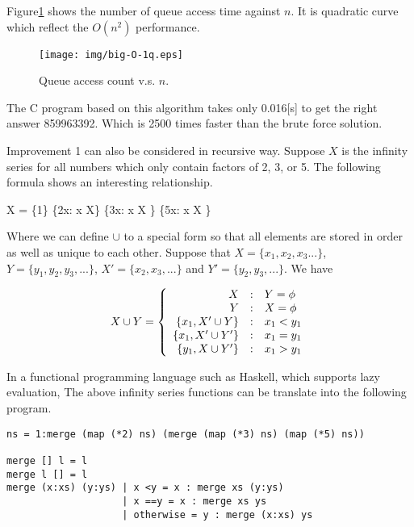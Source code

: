 \documentclass{article}
\begin{document}
Figure\ref{fig:big-O-1q} shows the number of queue access time against $n$.
It is quadratic curve which reflect the $O(n^2)$ performance.

\begin{figure}[htbp]
       \begin{center}
       	  \texttt{[image: img/big-O-1q.eps]}
        \caption{Queue access count v.s. $n$.} \label{fig:big-O-1q}
       \end{center}
\end{figure}

The C program based on this algorithm takes only 0.016[s] to get the right answer
859963392. Which is 2500 times faster than the brute force solution.

Improvement 1 can also be considered in recursive way. Suppose $X$ is the infinity
series for all numbers which only contain factors of 2, 3, or 5. The following
formula shows an interesting relationship.

\be
  X = \{1\} \cup \{2x: \forall x \in X\} \cup \{3x: \forall x \in X \} \cup \{5x: \forall x \in X \}
\ee

Where we can define $\cup$ to a special form so that all elements are stored in order
as well as unique to each other. Suppose that $X=\{x_1, x_2, x_3...\}$, $Y=\{y_1, y_2, y_3, ...\}$, $X' = \{x_2, x_3, ...\}$ and $Y'=\{y_2, y_3, ...\}$. We have

\[
X \cup Y = \left \{
  \begin{array}{r@{\quad:\quad}l}
  X & Y = \phi \\
  Y & X = \phi \\
  \{ x_1, X' \cup Y \} & x_1 < y_1 \\
  \{ x_1, X' \cup Y' \} & x_1 = y_1 \\
  \{ y_1, X \cup Y' \} & x_1 > y_1
  \end{array}
\right.
\]

In a functional programming language such as Haskell, which supports
lazy evaluation, The above infinity series functions can be translate
into the following program.

\lstset{language=Haskell}
\begin{lstlisting}
ns = 1:merge (map (*2) ns) (merge (map (*3) ns) (map (*5) ns))

merge [] l = l
merge l [] = l
merge (x:xs) (y:ys) | x <y = x : merge xs (y:ys)
                    | x ==y = x : merge xs ys
                    | otherwise = y : merge (x:xs) ys
\end{lstlisting}
\end{document}

